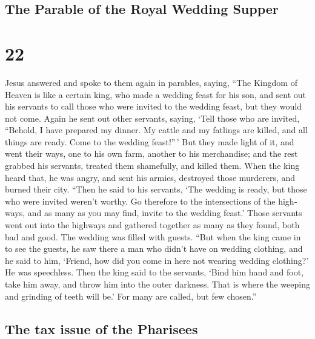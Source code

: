 \begin{paracol}{2}
\begin{otherlanguage}{english}
{\subsection{The Parable of the Royal Wedding
Supper}\label{the-parable-of-the-royal-wedding-supper}}

\hypertarget{section-43}{%
\section{22}\label{section-43}}

 Jesus answered and spoke to them again in parables,
saying,  ``The Kingdom of Heaven is like a certain king,
who made a wedding feast for his son,  and sent out his
servants to call those who were invited to the wedding feast, but they
would not come.  Again he sent out other servants, saying,
`Tell those who are invited, ``Behold, I have prepared my dinner. My
cattle and my fatlings are killed, and all things are ready. Come to the
wedding feast!''\,'  But they made light of it, and went
their ways, one to his own farm, another to his merchandise;
 and the rest grabbed his servants, treated them
shamefully, and killed them.  When the king heard that, he
was angry, and sent his armies, destroyed those murderers, and burned
their city.  ``Then he said to his servants, `The wedding
is ready, but those who were invited weren't worthy.  Go
therefore to the intersections of the highways, and as many as you may
find, invite to the wedding feast.'  Those servants went
out into the highways and gathered together as many as they found, both
bad and good. The wedding was filled with guests.  ``But
when the king came in to see the guests, he saw there a man who didn't
have on wedding clothing,  and he said to him, `Friend,
how did you come in here not wearing wedding clothing?' He was
speechless.  Then the king said to the servants, `Bind
him hand and foot, take him away, and throw him into the outer darkness.
That is where the weeping and grinding of teeth will be.'
 For many are called, but few chosen.''

\hypertarget{the-tax-issue-of-the-pharisees}{%
\subsection{The tax issue of the
Pharisees}\label{the-tax-issue-of-the-pharisees}}


\end{otherlanguage}
\end{paracol}
